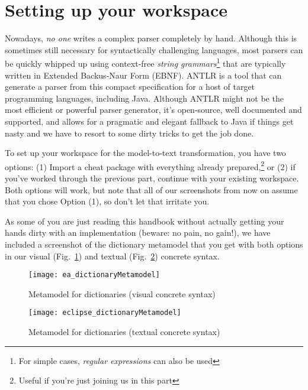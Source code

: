 \newpage
\section{Setting up your workspace}
\genHeader

Nowadays, \emph{no one} writes a complex parser completely by hand. Although this is sometimes still necessary for syntactically challenging languages, most
parsers can be quickly whipped up using context-free \emph{string grammars}\footnote{For simple cases, \emph{regular expressions} can also be used} that are
typically written in Extended Backus-Naur Form (EBNF). ANTLR is a tool that can generate a parser from this compact specification for
a host of target programming languages, including Java. Although ANTLR might not be the most efficient or powerful parser generator, it's open-source, well
documented and supported, and allows for a pragmatic and elegant fallback to Java if things get nasty and we have to resort to some dirty tricks to get the job
done.

To set up your workspace for the model-to-text transformation, you have two options: (1) Import a cheat package with everything already
prepared,\footnote{Useful if you're just joining us in this part} or (2) if you've worked through the previous part, continue with your existing
workspace. Both options will work, but note that all of our screenshots from now on assume that you chose Option (1), so don't let that irritate you.

As some of you are just reading this handbook without actually getting your hands dirty with an implementation (beware: no pain, no gain!), we have included a
screenshot of the dictionary metamodel that you get with both options in our visual (Fig.~\ref{ea:dictLang}) and textual (Fig.~\ref{eclipse:dictLangMetamodel})
concrete syntax.

\vspace{0.5cm}

\begin{figure}[htbp]
  \hspace{-1cm}
  \texttt{[image: ea\_dictionaryMetamodel]}
  \caption{Metamodel for dictionaries (visual concrete syntax)}
  \label{ea:dictLang}
\end{figure}

\newpage

\begin{figure}[h!]
  \hspace{-1cm}
  \texttt{[image: eclipse\_dictionaryMetamodel]}
  \caption{Metamodel for dictionaries (textual concrete syntax)}
  \label{eclipse:dictLangMetamodel}
\end{figure}

